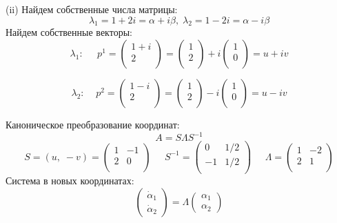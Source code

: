 \documentclass[a4paper, 12pt]{article}
\begin{document}
(ii) Найдем собственные числа матрицы:
\[\lambda_1=1+2i = \alpha+i\beta, \; \lambda_2=1-2i=\alpha-i\beta\]
Найдем собственные векторы:
\[\lambda_1:\;\;\;\;\; p^1=
\left(
\begin{array}{cc}
1+i\\
2\\
\end{array}
\right)  = \left(
\begin{array}{cc}
1\\
2\\
\end{array}
\right)+i \left(
\begin{array}{cc}
1\\
0\\
\end{array}
\right) = u+iv
\]



\[\lambda_2:\;\;\;\; p^2=
\left(
\begin{array}{cc}
1-i\\
2\\
\end{array}
\right) = \left(
\begin{array}{cc}
1\\
2\\
\end{array}
\right)-i \left(
\begin{array}{cc}
1\\
0\\
\end{array}
\right) = u-iv
\]


 Каноническое преобразование координат:
\[A = S\Lambda S^{-1}\]
\[
S = (u, \;-v) = \left(
\begin{array}{cc}
1 & -1\\
2 & 0\\
\end{array}
\right)\;\;\;\;\;
S^{-1} = \left(
\begin{array}{cc}
0 & 1/2\\
-1 & 1/2\\
\end{array}\right)\;\;\;\;\;
\Lambda = \left(
\begin{array}{cc}
1 & -2\\
2 & 1\\
\end{array}\right)
\]
Система в новых координатах:
\[\left(
\begin{array}{c}
\dot{\alpha}_1\\
\dot{\alpha}_2
\end{array}
\right)=\Lambda\left(
\begin{array}{c}
{\alpha}_1 \\
{\alpha}_2
\end{array}
\right)\]
\end{document}
